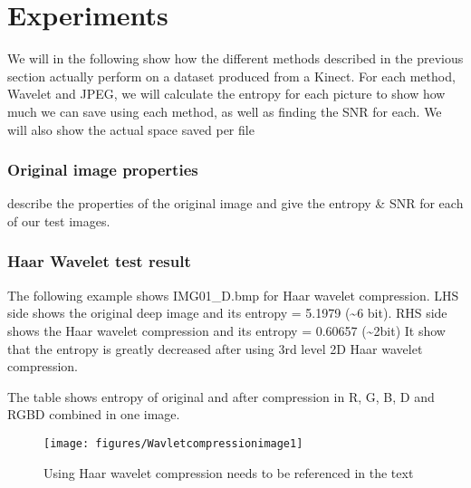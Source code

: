 \section{Experiments}

We will in the following show how the different methods described in the previous section actually perform on a dataset produced from a Kinect.
For each method, Wavelet and JPEG, we will calculate the entropy for each picture to show how much we can save using each method, as well as finding the SNR for each. We will also show the actual space saved per file

\subsubsection{Original image properties}

{\color{red}describe the properties of the original image and give the entropy \& SNR for each of our test images.}


\subsubsection{Haar Wavelet test result}
The following example shows IMG01\_D.bmp for Haar wavelet compression.
LHS side shows the original deep image and its entropy = 5.1979 (\textasciitilde 6 bit).
RHS side shows the Haar wavelet compression and its entropy = 0.60657 (\textasciitilde 2bit)
It show that the entropy is greatly decreased after using 3rd level 2D Haar wavelet compression.

The table shows entropy of original and after compression in R, G, B, D and RGBD combined in one image.

\begin{figure}[hbt]
  \center
        \texttt{[image: figures/Wavletcompressionimage1]}
        \caption{Using Haar wavelet compression \color{red} needs to be referenced in the text}
  \label{fig:haarwavelettest}
\end{figure}

